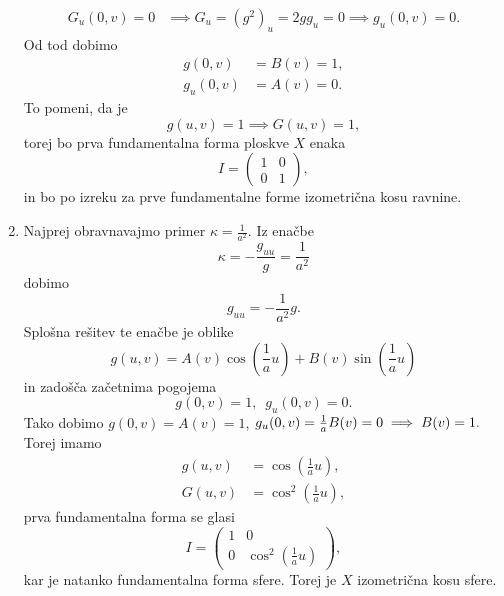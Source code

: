 \begin{enumerate}
\begin{align*}
            G_u(0,v)  = 0 &\implies G_u = (g^2)_u = 2gg_u = 0 \implies g_u(0, v) = 0.
        \end{align*} 
        Od tod dobimo \begin{align*}
            g(0,v) &= B(v) = 1, \\
            g_u(0,v) &= A(v) = 0.
        \end{align*}
        To pomeni, da je \begin{equation*}
        g(u,v) = 1 \implies G(u, v) = 1,
        \end{equation*}  
        torej bo prva fundamentalna forma ploskve $X$ enaka \begin{equation*}
        I = \begin{pmatrix}
        1 & 0 \\
        0 & 1
        \end{pmatrix},
        \end{equation*}  
        in bo po izreku za prve fundamentalne forme izometrična kosu ravnine.
\item Najprej obravnavajmo primer $\kappa = \frac{1}{a^2}.$ Iz enačbe \begin{equation*}
\kappa = - \frac{g_{uu}}{g} = \frac{1}{a^2}
\end{equation*}  
dobimo \begin{equation*}
g_{uu} = -\frac{1}{a^2} g.
\end{equation*}
Splošna rešitev te enačbe je oblike \begin{equation*}
g(u,v) = A(v) \cos (\frac{1}{a} u) + B(v) \sin(\frac{1}{a} u)
\end{equation*}in zadošča začetnima pogojema \begin{equation*}
g(0, v) = 1, \,\,\, g_u(0, v) = 0.
\end{equation*}  
Tako dobimo $g(0, v) = A(v) = 1$, $g_u(0,v) = \frac{1}{a} B(v) = 0 \implies B(v)  = 1 .\\$
Torej imamo \begin{align*}
    g(u,v) &= \cos (\frac{1}{a} u),  \\
    G(u,v) &= \cos^2 (\frac{1}{a} u),
\end{align*}
prva fundamentalna forma se glasi \begin{equation*}
I = \begin{pmatrix}
1 & 0 \\
0 & \cos^2 (\frac{1}{a} u)
\end{pmatrix},
\end{equation*}  
kar je natanko fundamentalna forma sfere. Torej je $X$ izometrična kosu sfere. 


\end{enumerate}
